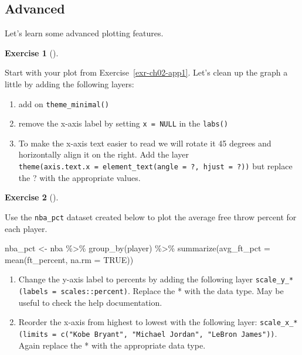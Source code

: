 \documentclass[
  letterpaper,
  DIV=11,
  numbers=noendperiod]{scrreprt}
\newenvironment{Shaded}{\begin{snugshade}}{\end{snugshade}}
\newcommand{\AttributeTok}[1]{\textcolor[rgb]{0.40,0.45,0.13}{#1}}
\newcommand{\ConstantTok}[1]{\textcolor[rgb]{0.56,0.35,0.01}{#1}}
\newcommand{\FunctionTok}[1]{\textcolor[rgb]{0.28,0.35,0.67}{#1}}
\newcommand{\NormalTok}[1]{\textcolor[rgb]{0.00,0.23,0.31}{#1}}
\newcommand{\OtherTok}[1]{\textcolor[rgb]{0.00,0.23,0.31}{#1}}
\newcommand{\SpecialCharTok}[1]{\textcolor[rgb]{0.37,0.37,0.37}{#1}}
\providecommand{\tightlist}{%
  \setlength{\itemsep}{0pt}\setlength{\parskip}{0pt}}\usepackage{longtable,booktabs,array}
\theoremstyle{definition}
\newtheorem{exercise}{Exercise}[chapter]
\theoremstyle{remark}
\begin{document}
\hypertarget{sec-ex02-advanced}{%
\subsection{Advanced}\label{sec-ex02-advanced}}

Let's learn some advanced plotting features.

\leavevmode{}%
\begin{exercise}[]\label{exr-ch02-adv1}

Start with your plot from Exercise~\ref{exr-ch02-app1}. Let's clean up
the graph a little by adding the following layers:

\begin{enumerate}
\def\labelenumi{\alph{enumi})}
\tightlist
\item
  add on \texttt{theme\_minimal()}
\item
  remove the x-axis label by setting \texttt{x\ =\ NULL} in the
  \texttt{labs()}
\item
  To make the x-axis text easier to read we will rotate it 45 degrees
  and horizontally align it on the right. Add the layer
  \texttt{theme(axis.text.x\ =\ element\_text(angle\ =\ ?,\ hjust\ =\ ?))}
  but replace the ? with the appropriate values.
\end{enumerate}

\end{exercise}

\leavevmode{}%
\begin{exercise}[]\label{exr-ch02-adv2}

Use the \texttt{nba\_pct} dataset created below to plot the average free
throw percent for each player.

\begin{Shaded}
\begin{Highlighting}[]
\NormalTok{nba\_pct }\OtherTok{\textless{}{-}}\NormalTok{ nba }\SpecialCharTok{\%\textgreater{}\%} 
    \FunctionTok{group\_by}\NormalTok{(player) }\SpecialCharTok{\%\textgreater{}\%}
    \FunctionTok{summarize}\NormalTok{(}\AttributeTok{avg\_ft\_pct =} \FunctionTok{mean}\NormalTok{(ft\_percent, }\AttributeTok{na.rm =} \ConstantTok{TRUE}\NormalTok{))}
\end{Highlighting}
\end{Shaded}

\begin{enumerate}
\def\labelenumi{\alph{enumi})}
\tightlist
\item
  Change the y-axis label to percents by adding the following layer
  \texttt{scale\_y\_*(labels\ =\ scales::percent)}. Replace the * with
  the data type. May be useful to check the help documentation.
\item
  Reorder the x-axis from highest to lowest with the following layer:
  \texttt{scale\_x\_*(limits\ =\ c("Kobe\ Bryant",\ "Michael\ Jordan",\ "LeBron\ James"))}.
  Again replace the * with the appropriate data type.
\end{enumerate}

\end{exercise}
\end{document}
